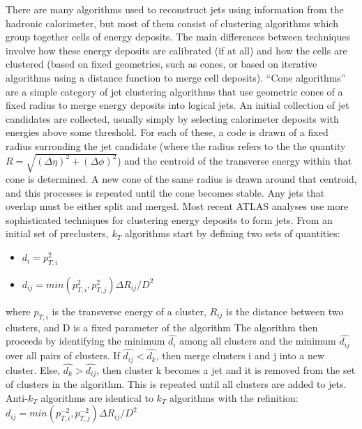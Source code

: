 There are many algorithms used to reconstruct jets using information from the hadronic calorimeter, but most of them consist of clustering algorithms which group together cells of energy deposits.
The main differences between techniques involve how these energy deposits are calibrated (if at all) and how the cells are clustered (based on fixed geometries, such as cones, or based on iterative algorithms using a distance function to merge cell deposits).
``Cone algorithms'' are a simple category of jet clustering algorithms that use geometric cones of a fixed radius to merge energy deposits into logical jets.
An initial collection of jet candidates are collected, usually simply by selecting calorimeter deposits with energies above some threshold.
For each of these, a code is drawn of a fixed radius surronding the jet candidate (where the radius refers to the the quantity $R = \sqrt{(\Delta \eta)^2 + (\Delta \phi)^2}$) and the centroid of the transverse energy within that cone is determined.
A new cone of the same radius is drawn around that centroid, and this processes is repeated until the cone becomes stable.
Any jets that overlap must be either split and merged.
Most recent ATLAS analyses use more sophisticated techniques for clustering energy deposits to form jets.
From an initial set of preclusters, $k_T$ algorithms start by defining two sets of quantities:
\begin{itemize}
\item $d_{i} = p_{T,i}^2$
\item $d_{ij} = min(p_{T,i}^2, p_{T,j}^2)\Delta R_{ij} / D^2$
\end{itemize}
where $p_{T,i}$ is the transverse energy of a cluster, $R_{ij}$ is the distance between two clusters, and D is a fixed parameter of the algorithm 
The algorithm then proceeds by identifying the minimum $\hat{d_{i}}$ among all clusters and the minimum $\hat{d_{ij}}$ over all pairs of clusters.
If $\hat{d_{ij}} < \hat{d_{k}}$, then merge clusters i and j into a new cluster.
Else, $\hat{d_{k}} > \hat{d_{ij}}$, then cluster k becomes a jet and it is removed from the set of clusters in the algorithm.
This is repeated until all clusters are added to jets.
Anti-$k_T$ algorithms are identical to $k_T$ algorithms with the refinition: $d_{ij} = min(p_{T,i}^{-2}, p_{T,j}^{-2})\Delta R_{ij} / D^2$



